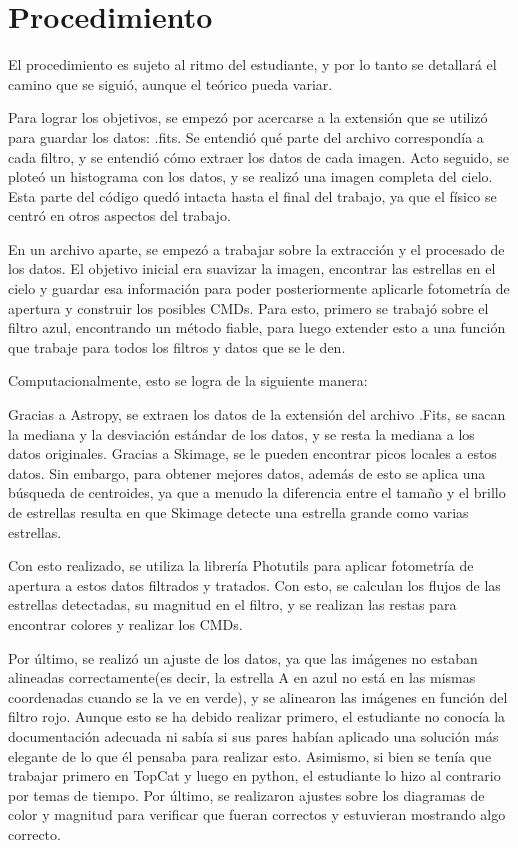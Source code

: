 \documentclass[10pt,twocolumn]{article}
\begin{document}
\section{Procedimiento}

El procedimiento es sujeto al ritmo del estudiante, y por lo tanto se detallará el camino que se siguió, aunque el teórico pueda variar.

Para lograr los objetivos, se empezó por acercarse a la extensión que se utilizó para guardar los datos: .fits. 
Se entendió qué parte del archivo correspondía a cada filtro, y se entendió cómo extraer los datos de cada imagen. 
Acto seguido, se ploteó un histograma con los datos, y se realizó una imagen completa del cielo. 
Esta parte del código quedó intacta hasta el final del trabajo, ya que el físico se centró en otros aspectos del trabajo.

En un archivo aparte, se empezó a trabajar sobre la extracción y el procesado de los datos. 
El objetivo inicial era suavizar la imagen, encontrar las estrellas en el cielo y guardar esa información para poder posteriormente aplicarle fotometría de apertura y construir los posibles CMDs. 
Para esto, primero se trabajó sobre el filtro azul, encontrando un método fiable, para luego extender esto a una función que trabaje para todos los filtros y datos que se le den. 

Computacionalmente, esto se logra de la siguiente manera:

Gracias a Astropy, se extraen los datos de la extensión del archivo .Fits, se sacan la mediana y la desviación estándar de los datos, y se resta la mediana a los datos originales. 
Gracias a Skimage, se le pueden encontrar picos locales a estos datos. Sin embargo, para obtener mejores datos, además de esto se aplica una búsqueda de centroides, 
ya que a menudo la diferencia entre el tamaño y el brillo de estrellas resulta en que Skimage detecte una estrella grande como varias estrellas. 

Con esto realizado, se utiliza la librería Photutils para aplicar fotometría de apertura a estos datos filtrados y tratados.
Con esto, se calculan los flujos de las estrellas detectadas, su magnitud en el filtro, y se realizan las restas para encontrar colores y realizar los CMDs. 

Por último, se realizó un ajuste de los datos, ya que las imágenes no estaban alineadas correctamente(es decir, la estrella A en azul no está en las mismas coordenadas cuando se la ve en verde), 
y se alinearon las imágenes en función del filtro rojo. Aunque esto se ha debido realizar primero, 
el estudiante no conocía la documentación adecuada ni sabía si sus pares habían aplicado una solución más elegante de lo que él pensaba para realizar esto. 
Asimismo, si bien se tenía que trabajar primero en TopCat y luego en python, el estudiante lo hizo al contrario por temas de tiempo. 
Por último, se realizaron ajustes sobre los diagramas de color y magnitud para verificar que fueran correctos y estuvieran mostrando algo correcto.
\end{document}
